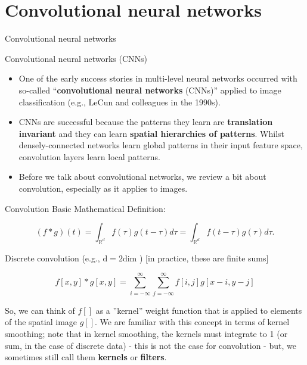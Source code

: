 \documentclass{beamer}
\begin{document}
\section{Convolutional neural networks}
\begin{frame}
\begin{center}
\Huge Convolutional neural networks
\end{center}
\end{frame}
\begin{frame}{Convolutional neural networks (CNNs)}
\begin{itemize}
\item One of the early success stories in multi-level neural networks occurred with so-called ``\textbf{convolutional neural networks} (CNNs)” applied to image classification (e.g., LeCun and colleagues in the 1990s).
\item CNNs are successful because the patterns they learn are \textbf{translation invariant} and they can learn \textbf{spatial hierarchies of patterns}. Whilst densely-connected networks learn global patterns in their input feature space, convolution layers learn local patterns.
\item Before we talk about convolutional networks, we review a bit about
convolution, especially as it applies to images.
\end{itemize}
\end{frame}
\begin{frame}{Convolution}
Basic Mathematical Definition:

$$
(f * g)(t)=\int_{\mathbb{R}^{d}} f(\tau) g(t-\tau) d \tau=\int_{\mathbb{R}^{d}} f(t-\tau) g(\tau) d \tau .
$$

Discrete convolution (e.g., $\mathrm{d}=2 \mathrm{dim}$ ) [in practice, these are finite sums]

$$
f[x, y] * g[x, y]=\sum_{i=-\infty}^{\infty} \sum_{j=-\infty}^{\infty} f[i, j] g[x-i, y-j]
$$

So, we can think of $f[]$ as a ''kernel'' weight function that is applied to elements of the spatial image $g[]$. We are familiar with this concept in terms of kernel smoothing; note that in kernel smoothing, the kernels must integrate to 1 (or sum, in the case of discrete data) - this is not the case for convolution - but, we sometimes still call them \textbf{kernels} or \textbf{filters}.
\end{frame}
\end{document}
